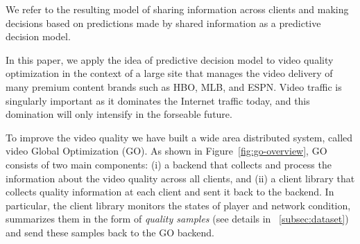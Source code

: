 We refer to the resulting model of sharing information
across clients and making decisions based on predictions made by
shared information as a predictive decision model. 




 
In this paper, we apply the idea of predictive decision model to video
quality optimization in the context of a large site that manages the
video delivery of many premium content brands such as HBO, MLB, and
ESPN. Video traffic is singularly important as it dominates the
Internet traffic today, and this domination will only intensify in the
forseable future.



To improve the video quality we have built a wide area distributed
system, called video Global Optimization (GO).  As shown in
Figure~\ref{fig:go-overview}, GO consists of two main components: (i)
a backend that collects and process the information about the video
quality across all clients, and (ii) a client library that collects
quality information at each client and sent it back to the backend. In
particular, the client library monitors the states of player and
network condition, summarizes them in the form of \emph{quality
  samples} (see details in \Section~\ref{subsec:dataset}) and send
these samples back to the GO backend.

